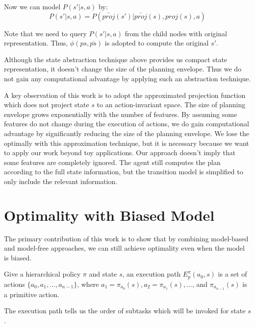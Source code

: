 Now we can model $P(s'|s, a)$ by:
\begin{equation}
    P(s'|s, a) = P(\bar{proj}(s')| \bar{proj}(s), proj(s), a)
\end{equation}

Note that we need to query $P(s'|s, a)$ from the child nodes with original representation.
Thus, $\phi(ps, \bar{ps})$ is adopted to compute the original $s'$.  

Although the state abstraction technique above provides us compact state representation, 
it doesn't change the size of the planning envelope. Thus we do not gain any computational
advantage by applying such an abstraction technique.

A key observation of this work is to adopt the approximated projection function which
does not project state $s$ to an action-invariant space.
The size of planning envelope grows exponentially with the number of features.
By assuming 
some features do not change during the execution of actions, we do gain computational advantage by
significantly reducing the size of the planning envelope. 
We lose the optimally with this approximation technique, but it is necessary because we want 
to apply our work beyond toy applications.
Our approach doesn't imply that
some features are completely ignored. The agent still computes the plan according to 
the full state information, but the transition model is simplified to only include the 
relevant information.

\section{Optimality with Biased Model}
The primary contribution of this work is to show that by combining model-based and 
model-free approaches, we can still achieve optimality even when the model is biased.

\begin{definition}
    Give a hierarchical policy $\pi$ and state $s$, an execution path $E_p^\pi(a_0, s)$ 
    is a set of actions $\{a_0, a_1, \dots, a_{n-1}\}$, where $a_1=\pi_{a_0}(s), a_2=\pi_{a_1}(s), \dots$,
    and $\pi_{a_{n-1}}(s)$ is a primitive action.
\end{definition}
The execution path tells us the order of subtasks which will be invoked for state $s$.


